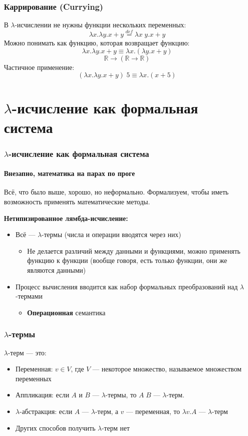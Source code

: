 \documentclass[xetex,mathserif,serif]{beamer}
\begin{document}
	\begin{frame}
		\frametitle{Каррирование (Currying)}
		В $\lambda$-исчислении не нужны функции нескольких переменных:
		$$\lambda x.\lambda y.x + y \stackrel{def}{=} \lambda x \; y.x + y$$
		Можно понимать как функцию, которая возвращает функцию:
		$$\lambda x.\lambda y.x + y \equiv \lambda x.(\lambda y.x + y)$$
		$$\mathbb{R} \rightarrow (\mathbb{R} \rightarrow \mathbb{R})$$
		Частичное применение:
		$$(\lambda x.\lambda y.x + y) \; 5 \equiv \lambda x.(x + 5)$$
	\end{frame}
	
	\section{$\lambda$-исчисление как формальная система}
		
	\begin{frame}
		\frametitle{$\lambda$-исчисление как формальная система}
		\framesubtitle{Внезапно, математика на парах по проге}
		Всё, что было выше, хорошо, но неформально. Формализуем, чтобы иметь возможность
		применять математические методы.
		
		\textbf{Нетипизированное лямбда-исчисление:}
		\begin{itemize}
			\item Всё --- $\lambda$-термы (числа и операции вводятся через них)
			\begin{itemize}
				\item Не делается различий между данными и функциями, можно применять 
						функцию к функции (вообще говоря, есть только функции, они же являются данными)
			\end{itemize}
			\item Процесс вычисления вводится как набор формальных преобразований над
					$\lambda$-термами
			\begin{itemize}
				\item \textbf{Операционная} семантика
			\end{itemize}
		\end{itemize}
	\end{frame}

	\begin{frame}
		\frametitle{$\lambda$-термы}
		$\lambda$-терм --- это:
		\begin{itemize}
			\item Переменная: $v \in V$, где $V$ --- некоторое множество, называемое
					множеством переменных
			\item Аппликация: если $A$ и $B$ --- $\lambda$-термы, то $A \; B$ ---
					$\lambda$-терм.
			\item $\lambda$-абстракция: если $A$ --- $\lambda$-терм, а $v$ --- переменная,
					то $\lambda v. A$ --- $\lambda$-терм
			\item Других способов получить $\lambda$-терм нет
		\end{itemize}
	\end{frame}
\end{document}
